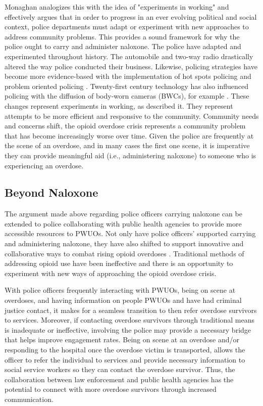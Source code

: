 Monaghan analogizes this with the idea of "experiments in working" and effectively argues that in order to progress in an ever evolving political and social context, police departments must adapt or experiment with new approaches to address community problems. This provides a sound framework for why the police ought to carry and administer naloxone. The police have adapted and experimented throughout history. The automobile and two-way radio drastically altered the way police conducted their business. Likewise, policing strategies have become more evidence-based with the implementation of hot spots policing and problem oriented policing \parencite{braga_hot_2019, hinkle_problemoriented_2020}. Twenty-first century technology has also influenced policing with the diffusion of body-worn cameras (BWCs), for example \parencite{white_cops_2020}. These changes represent experiments in working, as \textcite{monaghan_broken_2022} described it. They represent attempts to be more efficient and responsive to the community. Community needs and concerns shift, the opioid overdose crisis represents a community problem that has become increasingly worse over time. Given the police are frequently at the scene of an overdose, and in many cases the first one scene, it is imperative they can provide meaningful aid (i.e., administering naloxone) to someone who is experiencing an overdose. 

\subsection{Beyond Naloxone}

The argument made above regarding police officers carrying naloxone can be extended to police collaborating with public health agencies to provide more accessible resources to PWUOs. Not only have police officers' supported carrying and administering naloxone, they have also shifted to support innovative and collaborative ways to combat rising opioid overdoses \parencite{pourtaher_naloxone_2022, white_moving_2021}. Traditional methods of addressing opioid use have been ineffective and there is an opportunity to experiment with new ways of approaching the opioid overdose crisis. 

With police officers frequently interacting with PWUOs, being on scene at overdoses, and having information on people PWUOs and have had criminal justice contact, it makes for a seamless transition to then refer overdose survivors to services. Moreover, if contacting overdose survivors through traditional means is inadequate or ineffective, involving the police may provide a necessary bridge that helps improve engagement rates. Being on scene at an overdose and/or responding to the hospital once the overdose victim is transported, allows the officer to refer the individual to services and provide necessary information to social service workers so they can contact the overdose survivor. Thus, the collaboration between law enforcement and public health agencies has the potential to connect with more overdose survivors through increased communication. 

